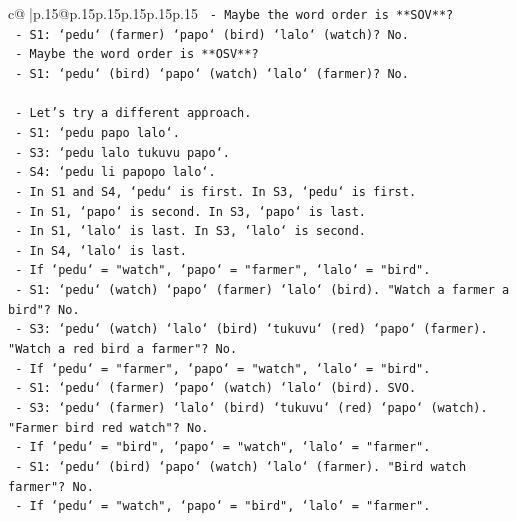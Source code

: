 \documentclass{article}
\begin{document}
{\begin{supertabular}{c@{$\;$}|p{.15\linewidth}@{}p{.15\linewidth}p{.15\linewidth}p{.15\linewidth}p{.15\linewidth}p{.15\linewidth}}
{{{\texttt{                   {-} Maybe the word order is **SOV**?} \\
\texttt{                     {-} S1: `pedu` (farmer) `papo` (bird) `lalo` (watch)? No.} \\
\texttt{                   {-} Maybe the word order is **OSV**?} \\
\texttt{                     {-} S1: `pedu` (bird) `papo` (watch) `lalo` (farmer)? No.} \\
\\ 
\texttt{                 {-} Let's try a different approach.} \\
\texttt{                   {-} S1: `pedu papo lalo`.} \\
\texttt{                   {-} S3: `pedu lalo tukuvu papo`.} \\
\texttt{                   {-} S4: `pedu li papopo lalo`.} \\
\texttt{                   {-} In S1 and S4, `pedu` is first. In S3, `pedu` is first.} \\
\texttt{                   {-} In S1, `papo` is second. In S3, `papo` is last.} \\
\texttt{                   {-} In S1, `lalo` is last. In S3, `lalo` is second.} \\
\texttt{                   {-} In S4, `lalo` is last.} \\
\texttt{                   {-} If `pedu` = "watch", `papo` = "farmer", `lalo` = "bird".} \\
\texttt{                     {-} S1: `pedu` (watch) `papo` (farmer) `lalo` (bird). "Watch a farmer a bird"? No.} \\
\texttt{                     {-} S3: `pedu` (watch) `lalo` (bird) `tukuvu` (red) `papo` (farmer). "Watch a red bird a farmer"? No.} \\
\texttt{                   {-} If `pedu` = "farmer", `papo` = "watch", `lalo` = "bird".} \\
\texttt{                     {-} S1: `pedu` (farmer) `papo` (watch) `lalo` (bird). SVO.} \\
\texttt{                     {-} S3: `pedu` (farmer) `lalo` (bird) `tukuvu` (red) `papo` (watch). "Farmer bird red watch"? No.} \\
\texttt{                   {-} If `pedu` = "bird", `papo` = "watch", `lalo` = "farmer".} \\
\texttt{                     {-} S1: `pedu` (bird) `papo` (watch) `lalo` (farmer). "Bird watch farmer"? No.} \\
\texttt{                   {-} If `pedu` = "watch", `papo` = "bird", `lalo` = "farmer".} \\
}}}
\end{supertabular}}
\end{document}
